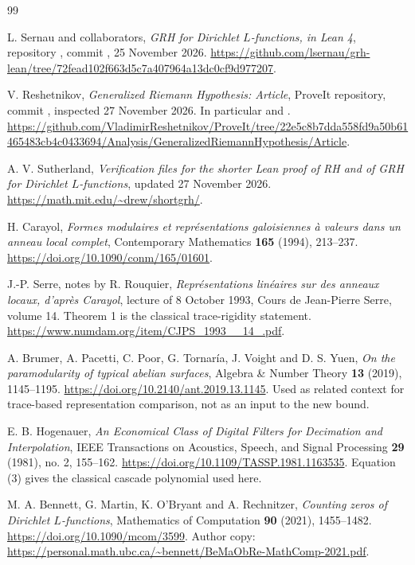 \begin{thebibliography}{99}

L. Sernau and collaborators,
\emph{GRH for Dirichlet $L$-functions, in Lean 4},
repository , commit
, 25 November 2026.
\url{https://github.com/lsernau/grh-lean/tree/72fead102f663d5c7a407964a13dc0cf9d977207}.

V. Reshetnikov, \emph{Generalized Riemann Hypothesis: Article},
ProveIt repository, commit
, inspected 27 November 2026.
In particular  and .
\url{https://github.com/VladimirReshetnikov/ProveIt/tree/22e5c8b7dda558fd9a50b61465483cb4c0433694/Analysis/GeneralizedRiemannHypothesis/Article}.

A. V. Sutherland,
\emph{Verification files for the shorter Lean proof of RH and of GRH
for Dirichlet $L$-functions}, updated 27 November 2026.
\url{https://math.mit.edu/~drew/shortgrh/}.

H. Carayol,
\emph{Formes modulaires et repr\'esentations galoisiennes \`a valeurs
dans un anneau local complet},
Contemporary Mathematics \textbf{165} (1994), 213--237.
\url{https://doi.org/10.1090/conm/165/01601}.

J.-P. Serre, notes by R. Rouquier,
\emph{Repr\'esentations lin\'eaires sur des anneaux locaux, d'apr\`es
Carayol}, lecture of 8 October 1993, Cours de Jean-Pierre Serre,
volume 14. Theorem 1 is the classical trace-rigidity statement.
\url{https://www.numdam.org/item/CJPS_1993__14_.pdf}.

A. Brumer, A. Pacetti, C. Poor, G. Tornar\'ia, J. Voight and D. S. Yuen,
\emph{On the paramodularity of typical abelian surfaces},
Algebra \& Number Theory \textbf{13} (2019), 1145--1195.
\url{https://doi.org/10.2140/ant.2019.13.1145}.
Used as related context for trace-based representation comparison,
not as an input to the new bound.

E. B. Hogenauer,
\emph{An Economical Class of Digital Filters for Decimation and
Interpolation}, IEEE Transactions on Acoustics, Speech, and Signal
Processing \textbf{29} (1981), no. 2, 155--162.
\url{https://doi.org/10.1109/TASSP.1981.1163535}.
Equation (3) gives the classical cascade polynomial used here.

M. A. Bennett, G. Martin, K. O'Bryant and A. Rechnitzer,
\emph{Counting zeros of Dirichlet $L$-functions},
Mathematics of Computation \textbf{90} (2021), 1455--1482.
\url{https://doi.org/10.1090/mcom/3599}.
Author copy:
\url{https://personal.math.ubc.ca/~bennett/BeMaObRe-MathComp-2021.pdf}.

\end{thebibliography}
